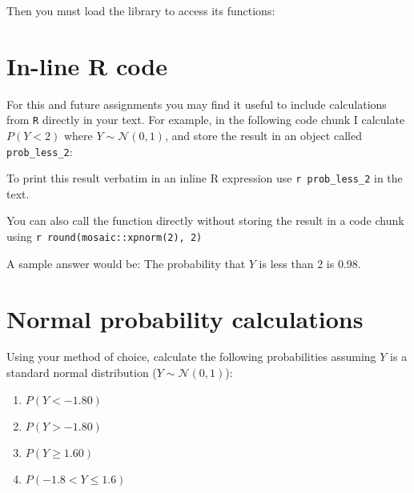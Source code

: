 \documentclass[letterpaper,9pt,twoside,printwatermark=false]{pinp}
\providecommand{\tightlist}{%
  \setlength{\itemsep}{0pt}\setlength{\parskip}{0pt}}
\begin{document}
Then you must load the library to access its functions:

\begin{Shaded}
\begin{Highlighting}[]
\end{Highlighting}
\end{Shaded}

\section*{In-line R code}\label{in-line-r-code}

For this and future assignments you may find it useful to include
calculations from \texttt{R} directly in your text. For example, in the
following code chunk I calculate \(P(Y < 2)\) where
\(Y \sim \mathcal{N}(0,1)\), and store the result in an object called
\texttt{prob\_less\_2}:

\begin{Shaded}
\begin{Highlighting}[]

\end{Highlighting}
\end{Shaded}

To print this result verbatim in an inline R expression use
\texttt{\textasciigrave{}r\ prob\_less\_2\textasciigrave{}} in the text.

\vspace{0.1in}

You can also call the function directly without storing the result in a
code chunk using
\texttt{\textasciigrave{}r\ round(mosaic::xpnorm(2),\ 2)\textasciigrave{}}

A sample answer would be: The probability that \(Y\) is less than 2 is
0.98.

\section{Normal probability
calculations}\label{normal-probability-calculations}

Using your method of choice, calculate the following probabilities
assuming \(Y\) is a standard normal distribution
(\(Y \sim \mathcal{N}(0,1)\)):

\begin{enumerate}
\def\labelenumi{\alph{enumi})}
\tightlist
\item
  \(P(Y < -1.80)\)
\item
  \(P(Y > -1.80)\)
\item
  \(P(Y \geq 1.60)\)
\item
  \(P(-1.8 < Y \leq 1.6)\)
\end{enumerate}
\end{document}
